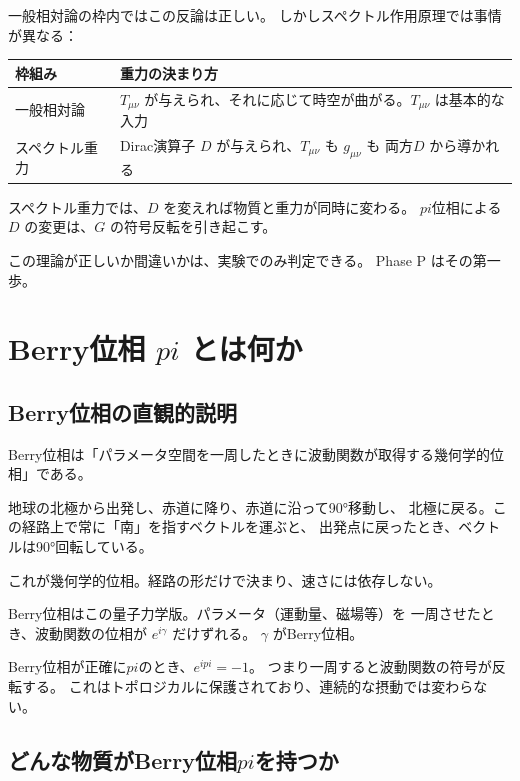\documentclass[11pt,a4paper]{article}
\def\pi{pi}%
\def\textbf#1{#1}%
\begin{document}
\textbf{一般相対論の枠内ではこの反論は正しい。}
しかしスペクトル作用原理では事情が異なる：

\begin{center}
\begin{tabular}{lp{8cm}}
\toprule
枠組み & 重力の決まり方 \\
\midrule
一般相対論 & $T_{\mu\nu}$ が与えられ、それに応じて時空が曲がる。$T_{\mu\nu}$ は基本的な入力 \\
スペクトル重力 & Dirac演算子 $D$ が与えられ、$T_{\mu\nu}$ も $g_{\mu\nu}$ も \textbf{両方}$D$ から導かれる \\
\bottomrule
\end{tabular}
\end{center}

スペクトル重力では、$D$ を変えれば\textbf{物質と重力が同時に変わる}。
$\pi$位相による $D$ の変更は、$G$ の符号反転を引き起こす。

\textbf{この理論が正しいか間違いかは、実験でのみ判定できる。}
Phase P はその第一歩。


\section{Berry位相 $\pi$ とは何か}

\subsection{Berry位相の直観的説明}

Berry位相は「パラメータ空間を一周したときに波動関数が取得する幾何学的位相」である。

\begin{tcolorbox}[colback=yellow!5,colframe=yellow!60!black,title=身近なアナロジー]
地球の北極から出発し、赤道に降り、赤道に沿って90°移動し、
北極に戻る。この経路上で常に「南」を指すベクトルを運ぶと、
出発点に戻ったとき、ベクトルは90°回転している。

これが幾何学的位相。経路の形だけで決まり、速さには依存しない。

Berry位相はこの量子力学版。パラメータ（運動量、磁場等）を
一周させたとき、波動関数の位相が $e^{i\gamma}$ だけずれる。
$\gamma$ がBerry位相。
\end{tcolorbox}

Berry位相が正確に$\pi$のとき、$e^{i\pi} = -1$。
つまり一周すると波動関数の符号が反転する。
これはトポロジカルに保護されており、連続的な摂動では変わらない。

\subsection{どんな物質がBerry位相$\pi$を持つか}
\end{document}

